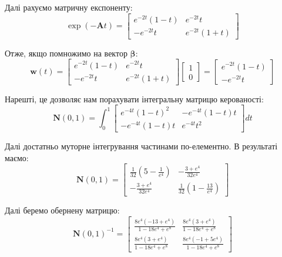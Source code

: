 \documentclass[oneside,solution]{karazin-control-assign}
\begin{document}
Далі рахуємо матричну експоненту:
\begin{equation}
    \exp(-\boldsymbol{A}t) = \begin{bmatrix}
        e^{-2t}(1-t) & e^{-2t}t \\
        -e^{-2t}t & e^{-2t}(1+t)
    \end{bmatrix}
\end{equation}

Отже, якщо помножимо на вектор $\boldsymbol{\beta}$:
\begin{equation}
    \mathbf{w}(t) = \begin{bmatrix}
        e^{-2t}(1-t) & e^{-2t}t \\
        -e^{-2t}t & e^{-2t}(1+t)
    \end{bmatrix}\begin{bmatrix}
        1 \\ 0
    \end{bmatrix} = \begin{bmatrix}
        e^{-2t}(1-t) \\
        -e^{-2t}t
    \end{bmatrix}
\end{equation}

Нарешті, це дозволяє нам порахувати інтегральну матрицю керованості:
\begin{equation}
    \boldsymbol{N}(0,1) = \int_0^1 \begin{bmatrix}
        e^{-4t}(1-t)^2 & -e^{-4t}(1-t)t \\
        -e^{-4t}(1-t)t & e^{-4t}t^2
    \end{bmatrix}dt
\end{equation}

Далі достатньо муторне інтегрування частинами по-елементно. В результаті маємо:
\begin{equation}
    \boldsymbol{N}(0,1) = \begin{bmatrix}
        \frac{1}{32}\left(5-\frac{1}{e^4}\right) & -\frac{3+e^4}{32e^4} \\
        -\frac{3+e^4}{32e^4} & \frac{1}{32}\left(1-\frac{13}{e^4}\right)
    \end{bmatrix}
\end{equation}

Далі беремо обернену матрицю:
\begin{equation}
    \boldsymbol{N}(0,1)^{-1} = \begin{bmatrix}
        \frac{8e^4(-13+e^4)}{1-18e^4+e^8} & \frac{8e^4(3+e^4)}{1-18e^4+e^8} \\
        \frac{8e^4(3+e^4)}{1-18e^4+e^8} & \frac{8e^4(-1+5e^4)}{1-18e^4+e^8}
    \end{bmatrix}
\end{equation}
\end{document}
